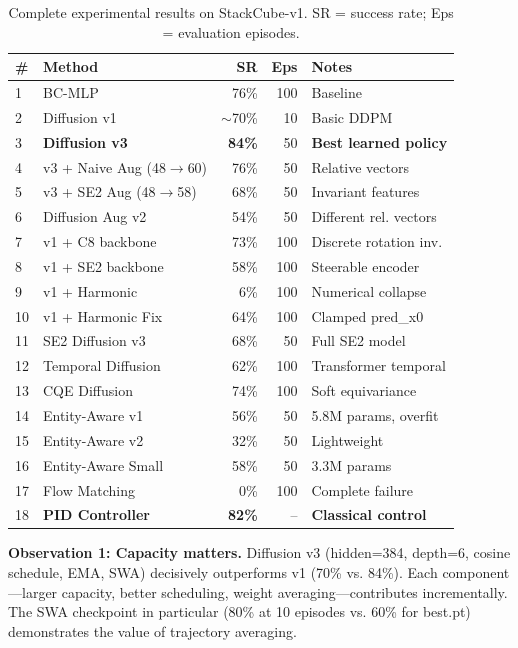 \documentclass[twocolumn]{article}
\begin{document}
\begin{table}
\centering
\caption{Complete experimental results on StackCube-v1. SR = success rate; Eps = evaluation episodes.}
\label{tab:results}
\begin{tabular}{l l r r l}
\toprule
\# & Method & SR & Eps & Notes \\
\midrule
1 & BC-MLP & 76\% & 100 & Baseline \\
2 & Diffusion v1 & $\sim$70\% & 10 & Basic DDPM \\
3 & \textbf{Diffusion v3} & \textbf{84\%} & 50 & \textbf{Best learned policy} \\
4 & v3 + Naive Aug (48$\rightarrow$60) & 76\% & 50 & Relative vectors \\
5 & v3 + SE2 Aug (48$\rightarrow$58) & 68\% & 50 & Invariant features \\
6 & Diffusion Aug v2 & 54\% & 50 & Different rel. vectors \\
7 & v1 + C8 backbone & 73\% & 100 & Discrete rotation inv. \\
8 & v1 + SE2 backbone & 58\% & 100 & Steerable encoder \\
9 & v1 + Harmonic & 6\% & 100 & Numerical collapse \\
10 & v1 + Harmonic Fix & 64\% & 100 & Clamped pred\_x0 \\
11 & SE2 Diffusion v3 & 68\% & 50 & Full SE2 model \\
12 & Temporal Diffusion & 62\% & 100 & Transformer temporal \\
13 & CQE Diffusion & 74\% & 100 & Soft equivariance \\
14 & Entity-Aware v1 & 56\% & 50 & 5.8M params, overfit \\
15 & Entity-Aware v2 & 32\% & 50 & Lightweight \\
16 & Entity-Aware Small & 58\% & 50 & 3.3M params \\
17 & Flow Matching & 0\% & 100 & Complete failure \\
18 & \textbf{PID Controller} & \textbf{82\%} & -- & \textbf{Classical control} \\
\bottomrule
\end{tabular}
\end{table}

\textbf{Observation 1: Capacity matters.} Diffusion v3 (hidden=384, depth=6, cosine schedule, EMA, SWA) decisively outperforms v1 (70\% vs. 84\%). Each component---larger capacity, better scheduling, weight averaging---contributes incrementally. The SWA checkpoint in particular (80\% at 10 episodes vs. 60\% for best.pt) demonstrates the value of trajectory averaging.
\end{document}
